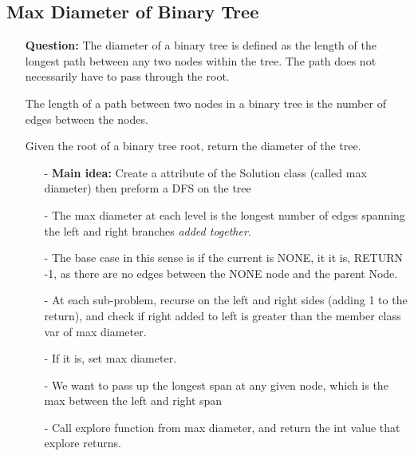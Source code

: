 \documentclass[12pt]{article}
\begin{document}
\subsection{Max Diameter of Binary Tree}
\begin{enumerate}
  \item[] \textbf{Question:} The diameter of a binary tree is defined as the length of the longest path between any two nodes within the tree. The path does not necessarily have to pass through the root.

The length of a path between two nodes in a binary tree is the number of edges between the nodes.

Given the root of a binary tree root, return the diameter of the tree.

    \begin{enumerate}
      \item[-] \textbf{Main idea:} Create a attribute of the Solution class (called max diameter) then preform a DFS on the tree
      \item[-] The max diameter at each level is the longest number of edges spanning the left and right branches \textit{added together}.
      \item[-] The base case in this sense is if the current is NONE, it it is, RETURN -1, as there are no edges between the NONE node and the parent Node. 
      \item[-] At each sub-problem, recurse on the left and right sides (adding 1 to the return), and check if right added to left is greater than the member class var of max diameter. 
      \item[-] If it is, set max diameter. 
      \item[-] We want to pass up the longest span at any given node, which is the max between the left and right span
      \item[-] Call explore function from max diameter, and return the int value that explore returns. 

    \end{enumerate}
\end{enumerate}
\end{document}
